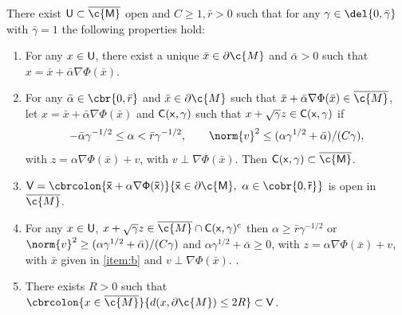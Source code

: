 \begin{theorem}
	\label{thm:tubul-neighb}
	There exist $\sf{U} \subset \cl{\c{M}}$ open and $C\geq 1, \bar{r} >0$ such that for any $\gamma \in \del{0, \bar{\gamma}}$ with $\bar{\gamma}=1$ the following properties hold: \begin{enumerate}[label=(\alph*)] \item For any $x \in \sf{U}$, there exist a unique $\bar{x} \in \partial \c{M}$ and $\bar{\alpha} >0$ such that $x = \bar{x} + \bar{\alpha} \nabla \Phi(\bar{x})$.
		      \label{item:b}
		\item For any $\bar{\alpha} \in \cbr{0,\bar{r}}$ and $\bar{x} \in \partial \c{M}$
		      such that $\bar{x} + \bar{\alpha} \nabla \Phi(\bar{x}) \in \cl{\c{M}}$, let
		      $x = \bar{x} + \bar{\alpha} \nabla \Phi(\bar{x})$ and $\sf{C}(x, \gamma)$ such
		      that $x + \sqrt{\gamma}z \in \sf{C}(x,\gamma)$ if
		      \begin{equation}
			      -\bar{\alpha}\gamma^{-1/2} \leq \alpha < \bar{r} \gamma^{-1/2} , \qquad \norm{v}^2 \leq ( \alpha \gamma^{1/2} + \bar{\alpha})/(C\gamma), \label{eq:def_msc}
		      \end{equation}
		      with $z = \alpha \nabla \Phi(\bar{x}) + v$, with $v \perp \nabla \Phi(\bar{x})$.
		      Then $\sf{C}(x, \gamma) \subset \cl{\c{M}}$.
		      \label{item:c}
		\item
		      $\sf{V} = \cbrcolon{\bar{x} + \alpha \nabla \Phi(\bar{x})}{\bar{x} \in
				      \partial \c{M}, \ \alpha \in \cobr{0,\bar{r}}}$ is open in $\cl{\c{M}}$. \label{item:c_prime}
		\item For any $x \in \sf{U}$,
		      $x + \sqrt{\gamma}z \in \cl{\c{M}} \cap \sf{C}(x,\gamma)^\mathrm{c}$ then
		      $\alpha \geq \bar{r}\gamma^{-1/2}$ or
		      $\norm{v}^2 \geq ( \alpha \gamma^{1/2} + \bar{\alpha})/(C\gamma)$ and
		      $\alpha \gamma^{1/2} + \bar{\alpha} \geq 0$, with
		      $z = \alpha \nabla \Phi(\bar{x}) + v$, with $\bar{x}$ given in
		      \ref{item:b} and $v \perp \nabla \Phi(\bar{x})$. \label{item:d}.
		\item There exists $R > 0$ such that
		      $\cbrcolon{x \in \cl{\c{M}}}{d(x, \partial \c{M}) \leq 2R } \subset \sf{V}$. \label{item:a}
	\end{enumerate}
\end{theorem}

